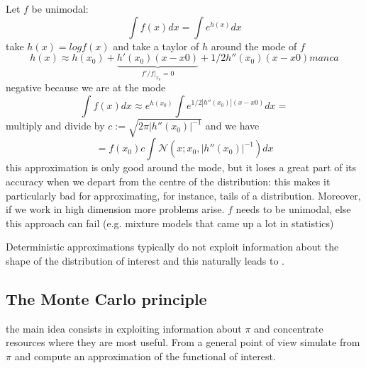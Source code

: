 \documentclass{article}
\begin{document}
	\begin{example}
		Let $f$ be unimodal:
		\begin{equation*}
			\int f (x) dx = \int e^{h(x)} dx 
		\end{equation*}
		take $h(x)= log f(x)$ and take a taylor of $h$ around the mode of $f$
		\begin{equation*}
			h(x)  \approx h (x_0) + \underbrace{h'(x_0)(x-x0)}_{f'/f|_{x_0}=0}+ 1/2h''(x_0)(x-x0) manca 
		\end{equation*}
		negative because we are at the mode
		\begin{equation*}
			\int f(x) dx \approx e ^{h(x_0)} \int  e ^{1/2 |h''(x_0)|(x-x0)} dx=
		\end{equation*}
		multiply and divide by $c:=\sqrt{2 \pi |h''(x_0)|^{-1}}$ and we have 
		\begin{equation*}
			=f(x_0) c \int \mathcal{N}(x; x_0, |h''(x_0)|^{-1})dx
		\end{equation*}
		this approximation is only good around the mode, but it loses a great part of its accuracy when we depart from the centre of the distribution: this makes it particularly bad for approximating, for instance, tails of a distribution. Moreover, if we work in high dimension more problems arise. $f$ needs to be unimodal, else this approach can fail (e.g. mixture models that came up a lot in statistics)     
	\end{example}
	
	Deterministic approximations typically do not exploit information about the shape of the distribution of interest and this naturally leads to . 
	\subsection{The Monte Carlo principle}
	the main idea consists in exploiting information about $\pi$ and concentrate resources where they are most useful. From a general point of view simulate from $\pi$ and compute an approximation of the functional of interest. 
	
\end{document}
